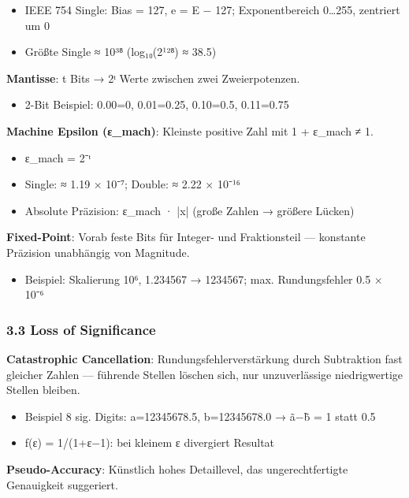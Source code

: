 \documentclass[11pt, a4paper]{article}
\begin{document}
\begin{itemize}
  \item IEEE 754 Single: Bias = 127, e = E − 127; Exponentbereich 0…255, zentriert um 0
  \item Größte Single ≈ 10³⁸ (log₁₀(2¹²⁸) ≈ 38.5)
\end{itemize}

\textbf{Mantisse}: t Bits → 2ᵗ Werte zwischen zwei Zweierpotenzen.

\begin{itemize}
  \item 2-Bit Beispiel: 0.00=0, 0.01=0.25, 0.10=0.5, 0.11=0.75
\end{itemize}

\textbf{Machine Epsilon (ε\_mach)}: Kleinste positive Zahl mit 1 + ε\_mach ≠ 1.

\begin{itemize}
  \item ε\_mach = 2⁻ᵗ
  \item Single: ≈ 1.19 × 10⁻⁷; Double: ≈ 2.22 × 10⁻¹⁶
  \item Absolute Präzision: ε\_mach · |x| (große Zahlen → größere Lücken)
\end{itemize}

\textbf{Fixed-Point}: Vorab feste Bits für Integer- und Fraktionsteil — konstante Präzision unabhängig von Magnitude.

\begin{itemize}
  \item Beispiel: Skalierung 10⁶, 1.234567 → 1234567; max. Rundungsfehler 0.5 × 10⁻⁶
\end{itemize}


\subsubsection{3.3 Loss of Significance}

\textbf{Catastrophic Cancellation}: Rundungsfehlerverstärkung durch Subtraktion fast gleicher Zahlen — führende Stellen löschen sich, nur unzuverlässige niedrigwertige Stellen bleiben.

\begin{itemize}
  \item Beispiel 8 sig. Digits: a=12345678.5, b=12345678.0 → ã−b̃ = 1 statt 0.5
  \item f(ε) = 1/(1+ε−1): bei kleinem ε divergiert Resultat
\end{itemize}

\textbf{Pseudo-Accuracy}: Künstlich hohes Detaillevel, das ungerechtfertigte Genauigkeit suggeriert.
\end{document}
